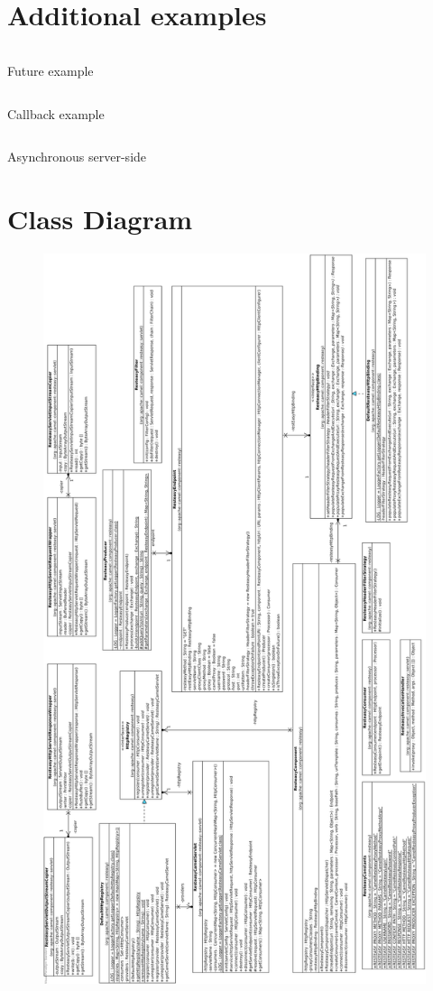 \documentclass[12pt,final,oneside]{fithesis2}
\begin{document}
\newpage
\section{Additional examples}
\begin{listing}[ht]
	\inputminted[]{java}{sources/future.java}
	\caption{Future example}
	\label{future}
\end{listing}
\begin{listing}[H]
	\inputminted[]{java}{sources/callbackClient.java}
	\caption{Callback example}
	\label{callbackClient}
\end{listing}

\begin{listing}[ht]
	\inputminted[]{java}{sources/asyncServer.java}
	\caption{Asynchronous server-side}
	\label{async-server}
\end{listing}
\newpage

\section{Class Diagram}\label{class-dia}
\begin{figure}[H]
\centering
\includegraphics[width=0.78\linewidth]{diagrams/class2.png}

\end{figure}
\end{document}
